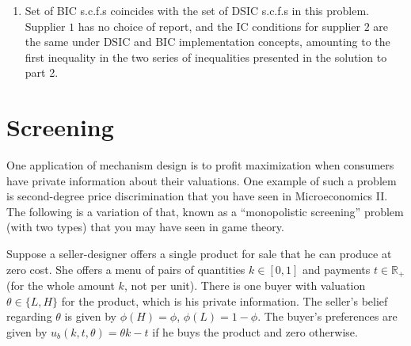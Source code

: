 \documentclass[a4paper]{article}
\begin{document}
\begin{enumerate}
	\item Set of BIC s.c.f.s coincides with the set of DSIC s.c.f.s in this problem. Supplier $1$ has no choice of report, and the IC conditions for supplier $2$ are the same under DSIC and BIC implementation concepts, amounting to the first inequality in the two series of inequalities presented in the solution to part 2.
\end{enumerate}
\fi 



\section{Screening}

One application of mechanism design is to profit maximization when consumers have private information about their valuations. One example of such a problem is second-degree price discrimination that you have seen in Microeconomics II. The following is a variation of that, known as a ``monopolistic screening'' problem (with two types) that you may have seen in game theory.

Suppose a seller-designer offers a single product for sale that he can produce at zero cost. She offers a menu of pairs of quantities $k \in [0,1]$ and payments $t \in \mathbb{R}_+$ (for the whole amount $k$, not per unit). There is one buyer with valuation $\theta \in \{ L,H \}$ for the product, which is his private information. The seller's belief regarding $\theta$ is given by $\phi(H) = \phi$, $\phi(L)=1-\phi$. The buyer's preferences are given by $u_b(k,t,\theta) = \theta k - t$ if he buys the product and zero otherwise.
\end{document}
